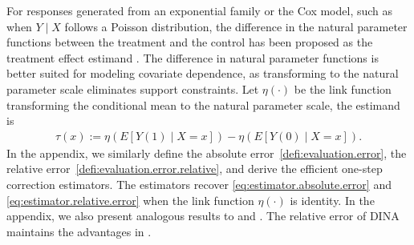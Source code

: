 \documentclass[twoside]{article}
\newcommand{\1}{{\mathbbm{1}}}
\begin{document}
For responses generated from an exponential family or the Cox model, such as when $ Y \mid X $ follows a Poisson distribution, the difference in the natural parameter functions between the treatment and the control has been proposed as the treatment effect estimand \parencite{gao2022DINA}.
The difference in natural parameter functions is better suited for modeling covariate dependence, as transforming to the natural parameter scale eliminates support constraints.
Let $\eta(\cdot)$ be the link function transforming the conditional mean to the natural parameter scale, the estimand is 
\begin{align*}
    \tau(x) := \eta(E[Y(1) \mid X = x]) - \eta(E[Y(0) \mid X = x]).
\end{align*} 
In the appendix, we similarly define the absolute error~\eqref{defi:evaluation.error}, the relative error~\eqref{defi:evaluation.error.relative}, 
and derive the efficient one-step correction estimators. 
The estimators recover \eqref{eq:estimator.absolute.error} and \eqref{eq:estimator.relative.error} when the link function $\eta(\cdot)$ is identity. 
In the appendix, we also present analogous results to  and .
The relative error of DINA maintains the advantages in .
\end{document}
